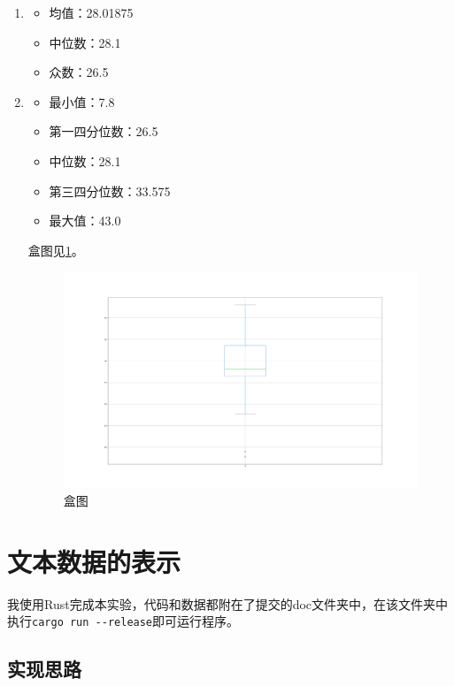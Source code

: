 \documentclass[12pt, UTF8]{article}
\begin{document}
\begin{enumerate}
  \item
    \begin{itemize}
      \item 均值：28.01875
      \item 中位数：28.1
      \item 众数：26.5
    \end{itemize}
  \item
    \begin{itemize}
      \item 最小值：7.8
      \item 第一四分位数：26.5
      \item 中位数：28.1
      \item 第三四分位数：33.575
      \item 最大值：43.0
    \end{itemize}
    
    盒图见\ref{fig:box}。
    
    \begin{figure}[!ht]
      \centering
      \includegraphics[width=1.0\textwidth]{box.png}
      \caption{盒图}
      \label{fig:box}
    \end{figure}
\end{enumerate}

\section{文本数据的表示}

我使用Rust完成本实验，代码和数据都附在了提交的doc文件夹中，在该文件夹中执行\lstinline{cargo run --release}即可运行程序。

\subsection{实现思路}
\end{document}
